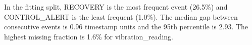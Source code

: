 In the fitting split, RECOVERY is the most frequent event (26.5\%) and CONTROL\_ALERT is the least frequent (1.0\%). The median gap between consecutive events is 0.96 timestamp units and the 95th percentile is 2.93. The highest missing fraction is 1.6\% for vibration\_reading.

